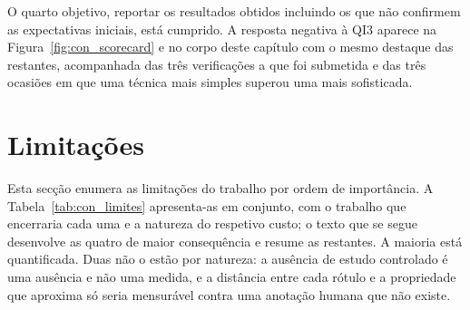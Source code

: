 O quarto objetivo, reportar os resultados obtidos incluindo os que não confirmem as expectativas
iniciais, está cumprido. A resposta negativa à \gls{QI}3 aparece na Figura~\ref{fig:con_scorecard}
e no corpo deste capítulo com o mesmo destaque das restantes, acompanhada das três verificações a
que foi submetida e das três ocasiões em que uma técnica mais simples superou uma mais
sofisticada.

\section{Limitações}
\label{sec:con_limitacoes}

Esta secção enumera as limitações do trabalho por ordem de importância. A
Tabela~\ref{tab:con_limites} apresenta-as em conjunto, com o trabalho que encerraria cada uma e a
natureza do respetivo custo; o texto que se segue desenvolve as quatro de maior consequência e
resume as restantes. A maioria está quantificada. Duas não o estão por natureza: a ausência de
estudo controlado é uma ausência e não uma medida, e a distância entre cada rótulo e a
propriedade que aproxima só seria mensurável contra uma anotação humana que não existe.

